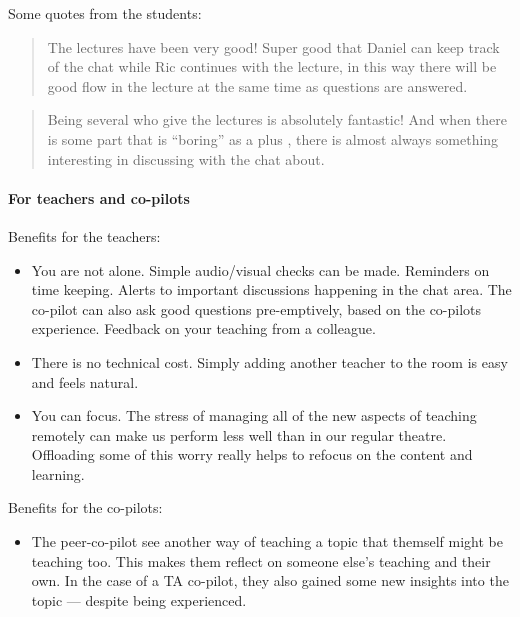 \documentclass[sigconf]{acmart}
\begin{document}
Some quotes from the students:
\begin{quote}
The lectures have been very good! Super good that Daniel can keep track of
the chat while Ric continues with the lecture, in this way there will be
good flow in the lecture at the same time as questions are answered.
\end{quote}

\begin{quote}
Being several who give the lectures is absolutely fantastic! And when there
is some part that is \enquote{boring} as a plus , there is almost always something
interesting in discussing with the chat about.
\end{quote}


\paragraph{For teachers and co-pilots}

Benefits for the teachers:

\begin{itemize}
  \item You are not alone. Simple audio/visual checks can be made. Reminders on 
    time keeping. Alerts to important discussions happening in the chat area.
    The co-pilot can also ask good questions pre-emptively, based on the co-pilots experience.
    Feedback on your teaching from a colleague.

  \item There is no technical cost. Simply adding another teacher to the room 
    is easy and feels natural.

  \item You can focus. The stress of managing all of the new aspects of 
    teaching remotely can make us perform less well than in our regular 
    theatre. Offloading some of this worry really helps to refocus on the 
    content and learning.
\end{itemize}

Benefits for the co-pilots:

\begin{itemize}
  \item The peer-co-pilot see another way of teaching a topic that themself 
    might be teaching too.
    This makes them reflect on someone else's teaching and their own.
    In the case of a TA co-pilot, they also gained some new insights into the
    topic --- despite being experienced.
\end{itemize}
\end{document}
